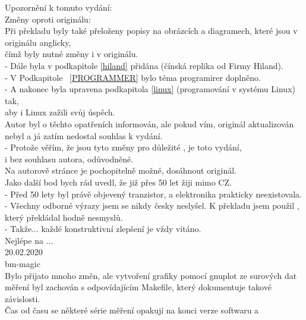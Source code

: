 Upozornění k tomuto vydání:
\vspace*{0.3cm}
\\Změny oproti originálu:
\\Při překladu byly také přeloženy popisy na obrázcích a diagramech, které jsou v originálu anglicky,
\\čímž byly nutné změny i v originálu. 
\\- Dále byla v podkapitole \ref{hiland} přidána (čínská replika od Firmy Hiland).
\\- V Podkapitole ~\ref{PROGRAMMER} bylo téma programirer doplněno.
\\- A nakonec byla upravena podkapitola \ref{linux} (programování v systému Linux) tak,
\\aby i Linux  zažili svůj úspěch.
\vspace*{0.3cm}
\\Autor byl o těchto opatřeních informován, ale pokud vím, originál aktualizován nebyl a já zatím nedostal souhlas k vydání.
\\ - Protože věřím, že jsou tyto změny pro  důležité , je toto vydání,
\\i bez souhlasu autora, odůvodněné.
\\Na autorově stránce \cite{khk} je pochopitelně možné, dosáhnout originál.
\vspace*{0.2cm}
\\Jako další bod bych rád uvedl, že již přes 50 let žiji mimo CZ.
\\- Před 50 lety byl právě objevený tranzistor, a elektronika prakticky neexistovala.
\\- Všechny odborné výrazy jsem se nikdy česky neslyšel. K překladu jsem použil ,
\\který překládal hodně nesmyslů.
\\- Takže... každé konstruktivní zlepšení je vždy vítáno.
\\Nejlépe na \cite{Svetelektro}... 
\vspace*{0.2cm}
\\20.02.2020\
\vspace*{0.2cm}
\\bm-magic
\vspace*{0.3cm}
\\Bylo přijato mnoho změn, ale vytvoření grafiky pomocí gnuplot ze surových dat měření
byl zachován s odpovídajícím Makefile, který dokumentuje takové závislosti. \\
Čas od času se některé série měření opakují na konci verze softwaru a
